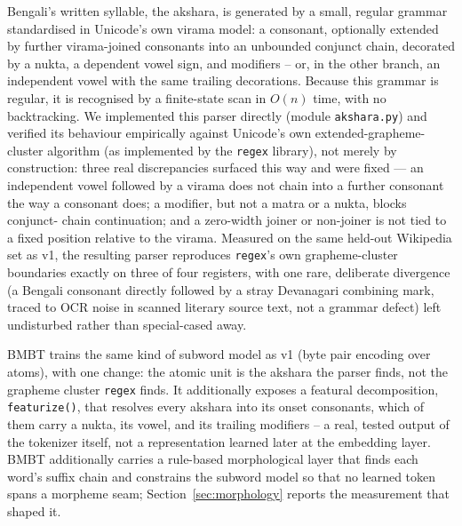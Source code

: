 \documentclass[11pt]{article}
\begin{document}
Bengali's written syllable, the akshara, is generated by a small, regular
grammar standardised in Unicode's own virama model: a consonant, optionally
extended by further virama-joined consonants into an unbounded conjunct
chain, decorated by a nukta, a dependent vowel sign, and modifiers -- or, in
the other branch, an independent vowel with the same trailing decorations.
Because this grammar is regular, it is recognised by a finite-state scan in
$O(n)$ time, with no backtracking. We implemented this parser directly
(module \texttt{akshara.py}) and verified its behaviour empirically against
Unicode's own extended-grapheme-cluster algorithm (as implemented by the
\texttt{regex} library), not merely by construction: three real
discrepancies surfaced this way and were fixed --- an independent vowel
followed by a virama does not chain into a further consonant the way a
consonant does; a modifier, but not a matra or a nukta, blocks conjunct-
chain continuation; and a zero-width joiner or non-joiner is not tied to a
fixed position relative to the virama. Measured on the same held-out
Wikipedia set as v1, the resulting parser reproduces \texttt{regex}'s own
grapheme-cluster boundaries exactly on three of four registers, with one
rare, deliberate divergence (a Bengali consonant directly followed by a
stray Devanagari combining mark, traced to OCR noise in scanned literary
source text, not a grammar defect) left undisturbed rather than
special-cased away.

BMBT trains the same kind of subword model as v1 (byte pair encoding over
atoms), with one change: the atomic unit is the akshara the parser finds,
not the grapheme cluster \texttt{regex} finds. It additionally exposes a
featural decomposition, \texttt{featurize()}, that resolves every akshara
into its onset consonants, which of them carry a nukta, its vowel, and its
trailing modifiers -- a real, tested output of the tokenizer itself, not a
representation learned later at the embedding layer. BMBT additionally
carries a rule-based morphological layer that finds each word's suffix chain
and constrains the subword model so that no learned token spans a morpheme
seam; Section~\ref{sec:morphology} reports the measurement that shaped it.
\end{document}
